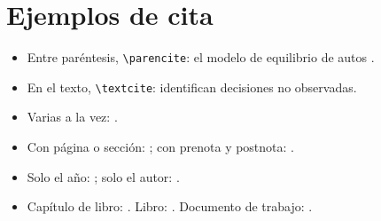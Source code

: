 \documentclass{article}
\begin{document}
\section{Ejemplos de cita}

\begin{itemize}
  \item Entre paréntesis, \verb|\parencite|: el modelo de equilibrio de autos
        \parencite{Gillingham2022}.
  \item En el texto, \verb|\textcite|: \textcite{HuXin2024} identifican decisiones no observadas.
  \item Varias a la vez: \parencite{Rust1985,Rust1987,HotzMiller1993}.
  \item Con página o sección: \parencite[sec.~6.3]{HuXin2024};
        con prenota y postnota: \parencite[véase][p.~1003]{Rust1987}.
  \item Solo el año: \citeyear{Akerlof1970}; solo el autor: \citeauthor{BLP1995}.
  \item Capítulo de libro: \textcite{Rust1994}. Libro: \textcite{NocedalWright2006}.
        Documento de trabajo: \textcite{Fukasawa2025}.
\end{itemize}


\printbibliography[title={Referencias}]  %
\end{document}
